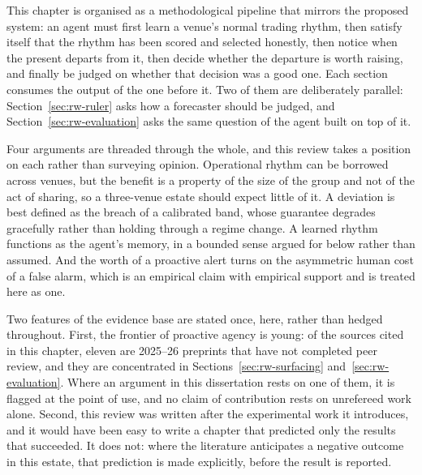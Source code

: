 %
%

This chapter is organised as a methodological pipeline that mirrors the
proposed system: an agent must first learn a venue's normal trading rhythm,
then satisfy itself that the rhythm has been scored and selected honestly, then
notice when the present departs from it, then decide whether the departure is
worth raising, and finally be judged on whether that decision was a good one.
Each section consumes the output of the one before it. Two of them are
deliberately parallel: Section~\ref{sec:rw-ruler} asks how a forecaster should
be judged, and Section~\ref{sec:rw-evaluation} asks the same question of the
agent built on top of it.

Four arguments are threaded through the whole, and this review takes a position
on each rather than surveying opinion. Operational rhythm can be borrowed across
venues, but the benefit is a property of the size of the group and not of the
act of sharing, so a three-venue estate should expect little of it. A deviation
is best defined as the breach of a calibrated band, whose guarantee degrades
gracefully rather than holding through a regime change. A learned rhythm
functions as the agent's memory, in a bounded sense argued for below rather
than assumed. And the worth of a proactive alert turns on the asymmetric human
cost of a false alarm, which is an empirical claim with empirical support and
is treated here as one.

Two features of the evidence base are stated once, here, rather than hedged
throughout. First, the frontier of proactive agency is young: of the sources
cited in this chapter, eleven are 2025--26 preprints that have not completed
peer review, and they are concentrated in
Sections~\ref{sec:rw-surfacing} and~\ref{sec:rw-evaluation}. Where an argument
in this dissertation rests on one of them, it is flagged at the point of use,
and no claim of contribution rests on unrefereed work alone. Second, this review
was written after the experimental work it introduces, and it would have been
easy to write a chapter that predicted only the results that succeeded. It does
not: where the literature anticipates a negative outcome in this estate, that
prediction is made explicitly, before the result is reported.

